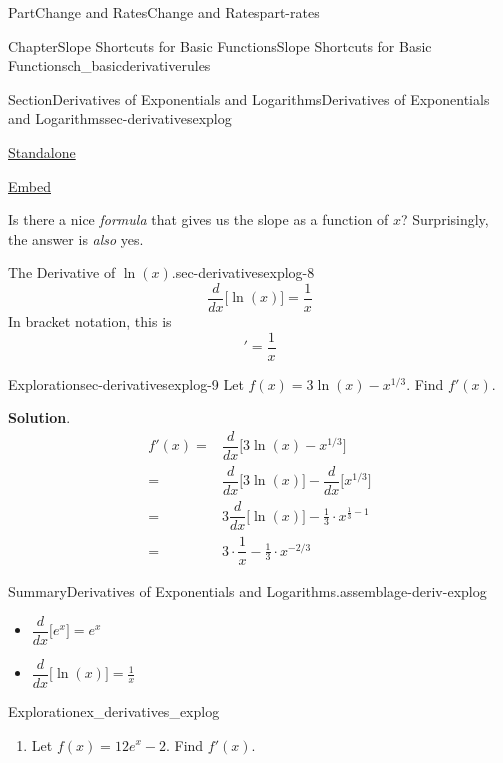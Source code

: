 \documentclass{tufte-book}
\newcommand{\blocktitlefont}{\relax}
\numberwithin{equation}{chapter}
\newcommand{\ddx}[1]{ \dfrac{d}{dx} \Big[ #1 \Big]  }
\newcommand{\amp}{&}
\begin{document}
\begin{partptx}{Part}{Change and Rates}{}{Change and Rates}{}{}{part-rates}
\begin{chapterptx}{Chapter}{Slope Shortcuts for Basic Functions}{}{Slope Shortcuts for Basic Functions}{}{}{ch_basicderivativerules}
\begin{sectionptx}{Section}{Derivatives of Exponentials and Logarithms}{}{Derivatives of Exponentials and Logarithms}{}{}{sec-derivativesexplog}
\begin{sidebyside}{2}{0.075}{0.075}{0.17}
\begin{sbspanel}{0.21}
\href{http://webwork.bridgew.edu/oer/functions_at_work/sec-derivativesexplog-7-5.html}{Standalone}%
\par
\href{http://webwork.bridgew.edu/oer/functions_at_work/sec-derivativesexplog-7-5-if.html}{Embed}%
\end{sbspanel}%
\end{sidebyside}%
 Is there a nice \emph{formula} that gives us the slope as a function of \(x\)?  Surprisingly, the answer is \emph{also} yes.%
\begin{paragraphs}{The Derivative of \(\ln(x)\).}{sec-derivativesexplog-8}%
%
\begin{equation*}
\ddx{\ln(x) } = \dfrac{1}{x}
\end{equation*}
In bracket notation, this is%
\begin{equation*}
[ \ln(x) ]' = \dfrac{1}{x}
\end{equation*}
\end{paragraphs}%
\begin{exploration}{Exploration}{}{sec-derivativesexplog-9}%
Let \(f(x) = 3\ln(x) - x^{1/3}\). Find \(f'(x)\).%
\par\smallskip%
\noindent\textbf{\blocktitlefont Solution}.\hypertarget{sec-derivativesexplog-9-2}{}\quad{}%
\begin{align*}
f'(x) = \amp  \ddx{ 3\ln(x) - x^{1/3} } \\
= \amp \ddx{3\ln(x)} - \ddx{x^{1/3}}\\
= \amp 3\ddx{\ln(x)} - \frac{1}{3} \cdot x^{\frac{1}{3}-1} \\
= \amp 3\cdot \dfrac{1}{x} - \frac{1}{3} \cdot x^{-2/3} 
\end{align*}
%
\end{exploration}%
\begin{assemblage}{Summary}{Derivatives of Exponentials and Logarithms.}{assemblage-deriv-explog}%
%
\begin{itemize}[label=\textbullet]
\item{}\(\displaystyle \ddx{e^x} = e^x \)%
\item{}\(\displaystyle \ddx{\ln(x)} = \frac{1}{x}\)%
\end{itemize}
%
\end{assemblage}
\begin{exploration}{Exploration}{}{ex_derivatives_explog}%
\begin{enumerate}[font=\bfseries,label=(\alph*),ref=\alph*]%
\item{}Let \(f(x) = 12e^x - 2\).  Find \(f'(x)\).%
\par\smallskip%

\end{enumerate}
\end{exploration}
\end{sectionptx}
\end{chapterptx}
\end{partptx}
\end{document}

